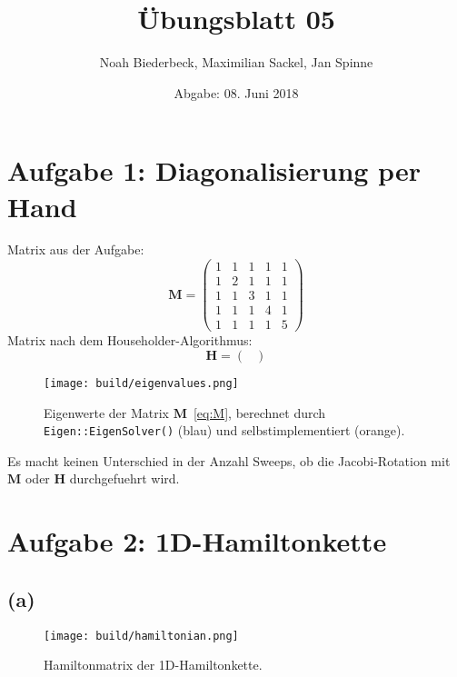 \documentclass{scrartcl}
\title{Übungsblatt 05}
\author{%
		Noah Biederbeck, Maximilian Sackel, Jan Spinne
}
\date{Abgabe: 08. Juni 2018}
\begin{document}
\maketitle

\section*{Aufgabe 1: Diagonalisierung per Hand}
Matrix aus der Aufgabe:
\begin{equation}
  \label{eq:M}
  \mathbf{M} = \left(\begin{matrix}
      1 & 1 & 1 & 1 & 1 \\
      1 & 2 & 1 & 1 & 1 \\
      1 & 1 & 3 & 1 & 1 \\
      1 & 1 & 1 & 4 & 1 \\
      1 & 1 & 1 & 1 & 5
  \end{matrix}\right)
\end{equation}
Matrix nach dem Householder-Algorithmus:
\begin{equation}
  \label{eq:H}
  \mathbf{H} = \left(\begin{matrix}
    
\end{matrix}\right)
\end{equation}
\begin{figure}[ht]
  \centering
  \texttt{[image: build/eigenvalues.png]}
  \caption{Eigenwerte der Matrix $\mathbf{M}$~\eqref{eq:M}, berechnet durch \texttt{Eigen::EigenSolver()} (blau) und selbstimplementiert (orange).}%
  \label{fig:eigenvalues}
\end{figure}
Es macht keinen Unterschied in der Anzahl Sweeps, ob die Jacobi-Rotation mit $\mathbf{M}$ oder $\mathbf{H}$ durchgefuehrt wird.

\section*{Aufgabe 2: 1D-Hamiltonkette}
\subsection*{(a)}
\begin{figure}[ht]
  \centering
  \texttt{[image: build/hamiltonian.png]}
  \caption{Hamiltonmatrix der 1D-Hamiltonkette.}%
  \label{fig:hamiltonkette}
\end{figure}
\end{document}
